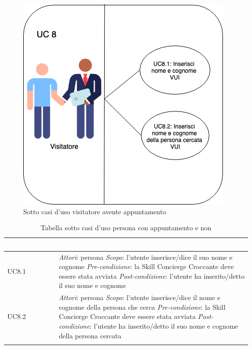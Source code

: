 \begin{figure}[H] 
    \centering 
    \includegraphics[width=0.7\columnwidth]{immagini/casi_duso21.png}
    \caption{\label{fig:attori}Sotto casi d'uso visitatore avente appuntamento}
\end{figure}
\begin{center}
	\centering
	\renewcommand{\arraystretch}{1.5}
	\begin{longtable}{  p{2.5cm} p{9.8cm} }
		\rowcolor{tableHead}
		\textbf{\textcolor{white}{Identificativo}} & \textbf{\textcolor{white}{Descrizione}} \\
		\endhead  
		
		UC8.1 &  \textit{Attori}: persona \newline \textit{Scopo}: l'utente inserisce/dice il suo nome e cognome \newline \textit{Pre-condizione}: la Skill Concierge Croccante deve essere stata avviata \newline \textit{Post-condizione}: l'utente ha inserito/detto il suo nome e cognome \\
		
		UC8.2 &  \textit{Attori}: persona  \newline \textit{Scopo}: l'utente inserisce/dice il nome e cognome della persona che cerca \newline \textit{Pre-condizione}: la Skill Concierge Croccante deve essere stata avviata \newline \textit{Post-condizione}: l'utente ha inserito/detto il suo nome e cognome della persona cercata \\

		\rowcolor{white}
		\caption{Tabella sotto casi d'uso persona con appuntamento e non}
	\end{longtable}
\end{center}
